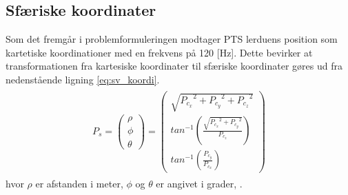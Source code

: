 \subsection{Sfæriske koordinater}
Som det fremgår i problemformuleringen modtager PTS lerduens position som kartetiske koordinationer med en frekvens på 120 [Hz]. Dette bevirker at transformationen fra kartesiske koordinater til sfæriske koordinater gøres ud fra nedenstående ligning \ref{eq:sv_koordi}.
\begin{align}
\begin{split}
{ P }_{ s } =\left( \begin{matrix} \rho  \\ \phi  \\ \theta  \end{matrix} \right) =\left( \begin{matrix} \sqrt { { { P }_{ c_{ x } } }^{ 2 }+{ { P }_{ c_{ y } } }^{ 2 }+{ { P }_{ c_{ z } } }^{ 2 } }  \\ { tan }^{ -1 }\left( \frac { \sqrt { { { P }_{ c_{ x } } }^{ 2 }+{ { P }_{ c_{ y } } }^{ 2 } }  }{ { P }_{ c_{ z } } }  \right)  \\ { tan }^{ -1 }\left( \frac { { P }_{ c_{ y } } }{ { P }_{ c_{ x } } }  \right)  \end{matrix} \right) %
\label{eq:sv_koordi}
\end{split}
\end{align}
hvor \(\rho\) er afstanden i meter, \(\phi\) og \(\theta\) er angivet i grader, \citep[Kap. 10.6]{adam}.
